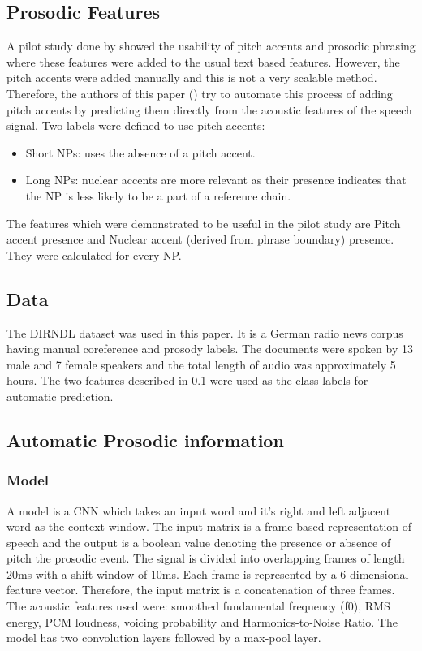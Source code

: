 \documentclass[a4paper]{article}
\begin{document}
\subsection{Prosodic Features} \label{prosodicfeatures}
A pilot study done by \cite{rosiger2015using} showed the usability of pitch accents and prosodic phrasing where these features were added to the usual text based features. However, the pitch accents were added manually and this is not a very scalable method. Therefore, the authors of this paper (\cite{rosiger2017improving}) try to automate this process of adding pitch accents by predicting them directly from the acoustic features of the speech signal. Two labels were defined to use pitch accents:

\begin{itemize}
  \item Short NPs: uses the absence of a pitch accent.
  \item Long NPs: nuclear accents are more relevant as their presence indicates that the NP is less likely to be a part of a reference chain.
\end{itemize}

The features which were demonstrated to be useful in the pilot study are Pitch accent presence and Nuclear accent (derived from phrase boundary) presence. They were calculated for every NP.

\subsection{Data}
The DIRNDL dataset was used in this paper. It is a German radio news corpus having manual coreference and prosody labels. The documents were spoken by 13 male and 7 female speakers and the total length of audio was approximately 5 hours. The two features described in \ref{prosodicfeatures} were used as the class labels for automatic prediction.

\subsection{Automatic Prosodic information}
\subsubsection{Model} \label{model}
A model is a CNN which takes an input word and it's right and left adjacent word as the context window. The input matrix is a frame based representation of speech and the output is a boolean value denoting the presence or absence of pitch the prosodic event. The signal is divided into overlapping frames of length 20ms with a shift window of 10ms. Each frame is represented by a 6 dimensional feature vector. Therefore, the input matrix is a concatenation of three frames. The acoustic features used were: smoothed fundamental frequency (f0), RMS energy, PCM loudness, voicing probability and Harmonics-to-Noise Ratio. The model has two convolution layers followed by a max-pool layer.
\end{document}
